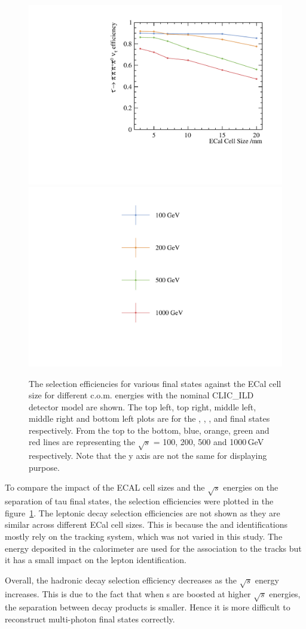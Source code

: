 \documentclass[a4paper,11pt]{article}
\newcommand{\decayPion}{\PGpm\PGnGt}
\newcommand{\decayRho}{\PGrP{\PGpm\PGpz}\PGnGt}
\newcommand{\decayAiPhoton}{\PaDoP{\PGpm\PGpz\PGpz}\PGnGt}
\newcommand{\decayAiPion}{\PaDoP{\PGpm\PGpm\PGpp}\PGnGt}
\newcommand{\decayThreePionPhoton}{\PGpm\PGpm\PGpp\PGpz\PGnGt}
\newcommand{\rootS}{\ensuremath{\sqrt{s}} }
\begin{document}
\begin{figure}[htbp]
\qquad
\includegraphics[width=.45\textwidth]{plots/decayMode6}
\qquad
\includegraphics[width=.45\textwidth]{plots/legend}
\caption{\label{fig:pion_efficiency} The selection efficiencies for various final states against the ECal cell size for different c.o.m. energies with the nominal CLIC\_ILD detector model are shown. The top left, top right, middle left, middle right and bottom left plots are for the \decayPion, \decayRho,  \decayAiPhoton, \decayAiPion  and \decayThreePionPhoton  final states respectively. From the top to the bottom, blue, orange, green and red lines are representing the \rootS = 100, 200, 500 and 1000\,GeV respectively. Note that the y axis are not the same for displaying purpose.}
\end{figure}

To compare the impact of the ECAL cell sizes and the \rootS energies on the separation of tau final states, the selection efficiencies were plotted in the figure~\ref{fig:pion_efficiency}. The leptonic decay selection efficiencies are not shown as they are similar across different ECal cell sizes. This is because the \Pepm and \PGmpm identifications mostly rely on the tracking system, which was not varied in this study. The energy deposited in the calorimeter are used for the association to the tracks but it has a small impact on the lepton identification. 

Overall, the hadronic decay selection efficiency decreases as the \rootS energy increases. This is due to the fact that when {\PGt}s are boosted at higher \rootS energies, the separation between decay products is smaller. Hence it is more difficult to reconstruct multi-photon final states correctly.
\end{document}
